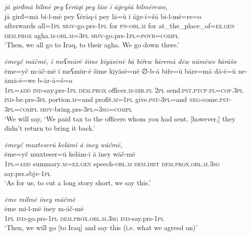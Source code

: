 \ea \label{BP.56}
\textit{jā girđmā bilmē pey ʕērāqī pey lāw ī āġeyšā bilmērewo,} \\ 
\gll jā girđ=mā bi-l-mē pey ʕērāq-ī pey lā=ū ī āġe-ī=šā bi-l-mē=re=o \\ 
 afterwards all\textsc{=\textsc{1pl}} \textsc{sbjv-}go.prs\textsc{-\textsc{1pl}} for \textsc{pn}\textsc{-obl}\textsc{.m} for at\_the\_place\_of\textsc{=ez.gen} \textsc{dem.prox} agha\textsc{.m}\textsc{-obl}\textsc{.m}\textsc{=3pl} \textsc{sbjv-}go.prs\textsc{-\textsc{1pl}}\textsc{=\textsc{povb}}\textsc{=compl} \\ 
\glt `Then, we all go to Iraq, to their agha. We go down there.'
\z 
 
\ea \label{BP.60}
\textit{ēmeyč māčmē, ī meʕmūrē šime kīyāsēnē bā biřew bāremā dēw nāmēwe bārāšo} \\ 
\gll ēme=yč m-āč-mē ī meʕmūr-ē šime kīyāsē=nē ∅-b-ā biře=ū bāre=mā dā-ē=ū ne-āmā-ē=we b-ār-ā=š=o \\ 
 \textsc{1pl}\textsc{=add} \textsc{ind-}say.prs\textsc{-\textsc{1pl}} \textsc{dem.prox} officer\textsc{.m}\textsc{-dir}\textsc{.pl} \textsc{2pl} send\textsc{.pst}\textsc{.ptcp}\textsc{.pl}\textsc{=cop}\textsc{.3pl} \textsc{ind-}be.prs\textsc{-3pl} portion\textsc{.m}=and profit\textsc{.m}\textsc{=\textsc{1pl}} give\textsc{.pst}\textsc{-3pl}=and \textsc{neg-}come\textsc{.pst}\textsc{-3pl}\textsc{=compl} \textsc{sbjv-}bring.prs\textsc{-3pl}\textsc{=3sg}\textsc{=compl} \\ 
\glt `We will say, ‘We paid tax to the officers whom you had sent, [however,] they didn’t return to bring it back.'
\z 
 
\ea \label{BP.63}
\textit{ēmeyč muxteserū kelāmī ā īney wāčmē,} \\ 
\gll ēme=yč muxteser=ū kelām-ī ā īney wāč-mē \\ 
 \textsc{1pl}\textsc{=add} summary\textsc{.m}\textsc{=ez.gen} speech\textsc{-obl}\textsc{.m} \textsc{dem.dist} \textsc{dem.prox}\textsc{.obl}\textsc{.m}\textsc{.3sg} say.prs.sbjv\textsc{-\textsc{1pl}} \\ 
\glt `As for us, to cut a long story short, we say this.'
\z 
 
\ea \label{BP.68}
\textit{ēme milmē īney māčmē} \\ 
\gll ēme mi-l-mē īney m-āč-mē \\ 
 \textsc{1pl} \textsc{ind-}go.prs\textsc{-\textsc{1pl}} \textsc{dem.prox}\textsc{.obl}\textsc{.m}\textsc{.3sg} \textsc{ind-}say.prs\textsc{-\textsc{1pl}} \\ 
\glt `Then, we will go [to Iraq] and say this (i.e. what we agreed on)'
\z 
 
